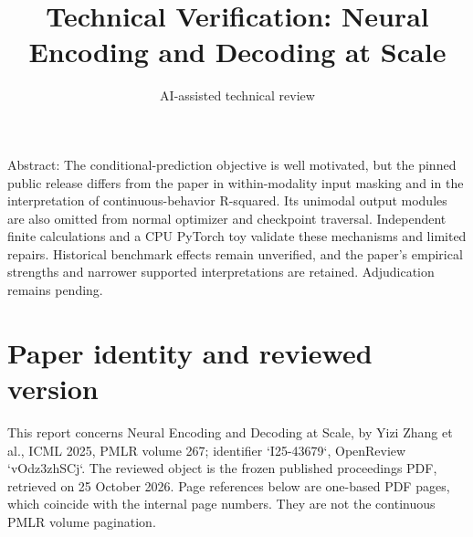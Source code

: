 \documentclass[10pt]{article}
\title{Technical Verification: Neural Encoding and Decoding at Scale}
\author{AI-assisted technical review}
\date{}
\begin{document}
\maketitle
Abstract: The conditional-prediction objective is well motivated, but the pinned public release differs from the paper in within-modality input masking and in the interpretation of continuous-behavior R-squared. Its unimodal output modules are also omitted from normal optimizer and checkpoint traversal. Independent finite calculations and a CPU PyTorch toy validate these mechanisms and limited repairs. Historical benchmark effects remain unverified, and the paper’s empirical strengths and narrower supported interpretations are retained. Adjudication remains pending.\par
\section*{Paper identity and reviewed version}
This report concerns Neural Encoding and Decoding at Scale, by Yizi Zhang et al., ICML 2025, PMLR volume 267; identifier `I25-43679`, OpenReview `vOdz3zhSCj`. The reviewed object is the frozen published proceedings PDF, retrieved on 25 October 2026. Page references below are one-based PDF pages, which coincide with the internal page numbers. They are not the continuous PMLR volume pagination.\par
\end{document}
